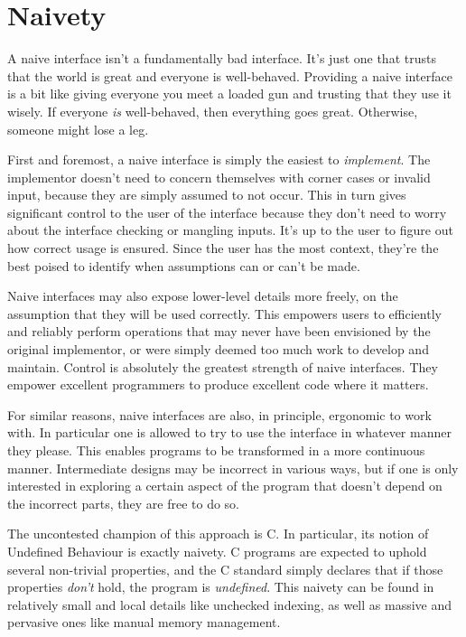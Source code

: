 \section{Naivety}

A naive interface isn't a fundamentally bad interface. It's just one that trusts
that the world is great and everyone is well-behaved. Providing a naive interface
is a bit like giving everyone you meet a loaded gun and trusting that they use
it wisely. If everyone \emph{is} well-behaved, then everything goes great. Otherwise,
someone might lose a leg.

First and foremost, a naive interface
is simply the easiest to \emph{implement}. The implementor doesn't need to concern
themselves with corner cases or invalid input, because they are simply assumed to not occur. This
in turn gives significant control to the user of the interface because they don't
need to worry about the interface checking or mangling inputs. It's up to the user
to figure out how correct usage is ensured. Since the user has the most context,
they're the best poised to identify when assumptions can or can't be made.

Naive interfaces may also expose lower-level details more freely, on the
assumption that they will be used correctly. This empowers users to efficiently
and reliably perform operations that may never have been envisioned by the
original implementor, or were simply deemed too much work to develop and maintain.
Control is absolutely the greatest strength of naive interfaces. They empower
excellent programmers to produce excellent code where it matters.

For similar reasons, naive interfaces are also, in principle, ergonomic to work
with. In particular one is allowed to try to use the interface in whatever
manner they please. This enables programs to be transformed in a more continuous
manner. Intermediate designs may be incorrect in various ways, but if one is
only interested in exploring a certain aspect of the program that doesn't depend
on the incorrect parts, they are free to do so.

The uncontested champion of this approach is C. In particular, its notion of
Undefined Behaviour is exactly naivety. C programs are expected to uphold
several non-trivial properties, and the C standard simply declares that if those
properties \emph{don't} hold, the program is \emph{undefined}. This naivety can be found in
relatively small and local details like unchecked indexing, as well as massive
and pervasive ones like manual memory management.

